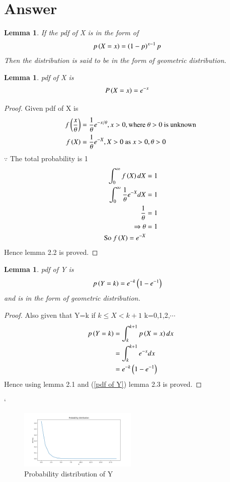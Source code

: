 \documentclass[journal,12pt,twocolumn]{IEEEtran}
\newtheorem{lemma}[theorem]{Lemma}
\begin{document}
\section{Answer}
\begin{lemma}
If the pdf of X is in the form of 
\begin{align}
p\left(X=x\right)&=\left(1-p\right)^{x-1} p
\end{align} 
Then the distribution is said to be in the form of geometric distribution. 
\end{lemma}
\begin{lemma}
pdf of X is 
\begin{align}
P\left(X=x\right)&=e^{-x}
\end{align}
\end{lemma}
\begin{proof}
Given pdf of X is 
\begin{align}
f\left(\frac{x}{\theta}\right)&=\frac{1}{\theta} e^{-x/\theta},x>0,\text{where } \theta >0 \text{ is unknown}\\
f\left(X\right)&=\frac{1}{\theta}e^{-X},X>0\text{ as }x>0,\theta>0
\end{align}
$\because$ The total probability is 1 
\begin{align}
\int_0 ^\infty f\left(X\right) dX &=1 \\
\int _0^\infty \frac{1}{\theta} e^{-X} dX&=1 \nonumber \\
\frac{1}{\theta}&=1 \nonumber \\
\Rightarrow \theta &=1 \\
\text{So }f\left(X\right) = e^{-X}
\end{align}
Hence lemma 2.2 is proved.
\end{proof}
\begin{lemma}
pdf of Y is 
\begin{align}
p\left(Y=k\right)&=e^{-k} \left(1-e^{-1}\right)
\end{align}
and is in the form of geometric distribution.
\end{lemma}
\begin{proof}
Also given that Y=k if $k \leq X <k+1$ k=0,1,2,$\cdots$
\begin{align}
p\left(Y=k\right)&=\int_k^{k+1} p\left(X=x\right) dx\\
&=\int_k^{k+1} e^{-x} dx \nonumber \\
&=e^{-k}\left(1-e^{-1}\right) \label{pdf of Y}
\end{align}
Hence using lemma 2.1  and (\ref{pdf of Y}) lemma 2.3 is proved.
\end{proof}`
\begin{figure}[ht]
    \centering
    \includegraphics[width=0.5\textwidth]{Figure_1.png}
    \caption{Probability distribution of Y}
    \label{fig:my_label}
\end{figure}
\end{document}
